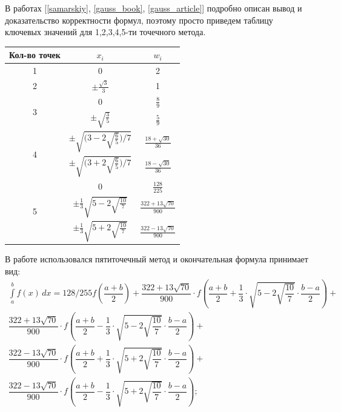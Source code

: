 В работах [\ref{samarskiy}, \ref{gauss_book}, \ref{gauss_article}] подробно описан вывод и доказательство корректности формул, поэтому просто приведем таблицу 
ключевых значений для 1,2,3,4,5-ти точечного метода.

\begin{center}

\renewcommand{\arraystretch}{2}
\begin{tabular}{|c|c|c|}
\hline
Кол-во точек    & $x_i$ & $w_i$ \\
\hline\hline
1    & 0  & 2\\[5pt] \hline
2     & $\pm\frac{\sqrt{3}}{3}$   & 1 \\[5pt] \hline
\multirow{2}{*}{3}    & 0  & $\frac 89$\\[5pt] \cline{2-3}
& $\pm \sqrt{\frac 3 5}$  & $\frac 5 9$\\[5pt] \hline

\multirow{2}{*}{4}    & $\pm\sqrt{\Big( 3 - 2\sqrt{\frac65} \Big)/7}$ & $\frac{18+\sqrt{30}}{36}$\\[5pt] \cline{2-3}
& $\pm\sqrt{\Big( 3 + 2\sqrt{\frac{6}{5}} \Big)/7}$ & $\frac{18-\sqrt{30}}{36}$\\[5pt] \hline

\multirow{3}{*}{5}    & 0 & $\frac{128}{225}$\\[5pt] \cline{2-3}
& $\pm\frac13\sqrt{5-2\sqrt{\frac{10}{7}}}$ & $\frac{322+13\sqrt{70}}{900}$\\[5pt] \cline{2-3}
& $\pm\frac13\sqrt{5+2\sqrt{\frac{10}{7}}}$ & $\frac{322-13\sqrt{70}}{900}$\\[5pt] \hline

\end{tabular}
\label{gauss_table}
\end{center}

В работе использовался пятиточечный метод и окончательная формула принимает вид:
\begin{equation}
\begin{split}
	\int\limits_a^b f(x)\,dx =  128/255 f(\dfrac{a+b}{2})+
  \dfrac{322+13\sqrt{70}}{900}\cdot f\left(\dfrac{a+b}{2} + \dfrac 13\cdot \sqrt{5-2\sqrt{\dfrac{10}{7}}}\cdot\dfrac{b-a}{2}\right) +\\
  \dfrac{322+13\sqrt{70}}{900}\cdot f\left(\dfrac{a+b}{2} - \dfrac 13\cdot \sqrt{5-2\sqrt{\dfrac{10}{7}}}\cdot\dfrac{b-a}{2}\right) +\\
  \dfrac{322-13\sqrt{70}}{900}\cdot f\left(\dfrac{a+b}{2} + \dfrac 13\cdot \sqrt{5+2\sqrt{\dfrac{10}{7}}}\cdot\dfrac{b-a}{2}\right) +\\
  \dfrac{322-13\sqrt{70}}{900}\cdot f\left(\dfrac{a+b}{2} - \dfrac 13\cdot \sqrt{5+2\sqrt{\dfrac{10}{7}}}\cdot\dfrac{b-a}{2}\right);
\end{split}
\end{equation}

